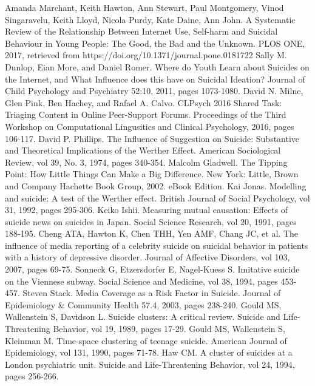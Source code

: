 \documentclass{article}
\begin{document}
\begin{thebibliography}{9}

Amanda Marchant,  Keith Hawton,  Ann Stewart,  Paul Montgomery,  Vinod Singaravelu,  Keith Lloyd,  Nicola Purdy,  Kate Daine,  Ann John. A Systematic Review of the Relationship Between Internet Use, Self-harm and Suicidal Behaviour in Young People: The Good, the Bad and the Unknown. PLOS ONE, 2017, retrieved from https://doi.org/10.1371/journal.pone.0181722
Sally M. Dunlop, Eian More, and Daniel Romer. Where do Youth Learn about Suicides on the Internet, and What Influence does this have on Suicidal Ideation? Journal of Child Psychology and Psychiatry 52:10, 2011, pages 1073-1080.
David N. Milne, Glen Pink, Ben Hachey, and Rafael A. Calvo. CLPsych 2016 Shared Task: Triaging Content in Online Peer-Support Forums. Proceedings of the Third Workshop on Computational Lingusitics and Clinical Psychology, 2016, pages 106-117.
David P. Phillips. The Influence of Suggestion on Suicide: Substantive and Theoretical Implications of the Werther Effect. American Sociological Review, vol 39, No. 3, 1974, pages 340-354.
Malcolm Gladwell. The Tipping Point: How Little Things Can Make a Big Difference. New York: Little, Brown and Company Hachette Book Group, 2002. eBook Edition.
Kai Jonas. Modelling and suicide: A test of the Werther effect. British Journal of Social Psychology, vol 31, 1992, pages 295-306.
Keiko Ishii. Measuring mutual causation: Effects of suicide news on suicides in Japan. Social Science Research, vol 20, 1991, pages 188-195.
Cheng ATA, Hawton K, Chen THH, Yen AMF, Chang JC, et al. The influence of media reporting of a celebrity suicide on suicidal behavior in patients with a history of depressive disorder. Journal of Affective Disorders, vol 103, 2007, pages 69-75.
Sonneck G, Etzersdorfer E, Nagel-Kuess S. Imitative suicide on the Viennese subway. Social Science and Medicine, vol 38, 1994, pages 453-457.
Steven Stack. Media Coverage as a Risk Factor in Suicide. Journal of Epidemiology \& Community Health 57.4, 2003, pages 238-240.
Gould MS, Wallenstein S, Davidson L. Suicide clusters: A critical review. Suicide and Life-Threatening Behavior, vol 19, 1989, pages 17-29.
Gould MS, Wallenstein S, Kleinman M. Time-space clustering of teenage suicide. American Journal of Epidemiology, vol 131, 1990, pages 71-78.
Haw CM. A cluster of suicides at a London psychiatric unit. Suicide and Life-Threatening Behavior, vol 24, 1994, pages 256-266.

\end{thebibliography}
\end{document}
